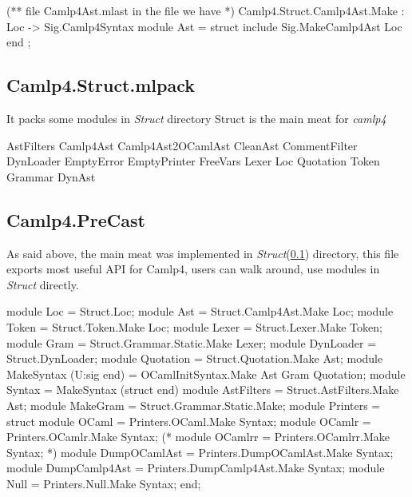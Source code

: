 \inputminted[fontsize=\scriptsize,]{ocaml}{code/camlp4/source/AstFilters.ml}



\begin{ocamlcode}
(** file Camlp4Ast.mlast   in the file we have *)
Camlp4.Struct.Camlp4Ast.Make : Loc -> Sig.Camlp4Syntax
  module Ast = struct
     include Sig.MakeCamlp4Ast Loc 
  end ;
\end{ocamlcode}


\subsection{Camlp4.Struct.mlpack}
\label{Camlp4.Struct}
It packs some modules in \textit{Struct} directory
Struct is the main meat for \textit{camlp4}

\begin{bashcode}
AstFilters
Camlp4Ast
Camlp4Ast2OCamlAst
CleanAst
CommentFilter
DynLoader
EmptyError
EmptyPrinter
FreeVars
Lexer
Loc
Quotation
Token
Grammar
DynAst
\end{bashcode}


\subsection{Camlp4.PreCast}

As said above, the main meat was implemented in
\textit{Struct}(\ref{Camlp4.Struct}) directory, this file exports most
useful API for Camlp4, users can walk around, use modules in
\textit{Struct} directly.

\begin{ocamlcode}
  module Loc = Struct.Loc;
  module Ast = Struct.Camlp4Ast.Make Loc;
  module Token = Struct.Token.Make Loc;
  module Lexer = Struct.Lexer.Make Token;
  module Gram = Struct.Grammar.Static.Make Lexer;
  module DynLoader = Struct.DynLoader;
  module Quotation = Struct.Quotation.Make Ast;
  module MakeSyntax (U:sig end) =
    OCamlInitSyntax.Make Ast Gram Quotation;
  module Syntax = MakeSyntax (struct end)
  module AstFilters = Struct.AstFilters.Make Ast;
  module MakeGram = Struct.Grammar.Static.Make;
  module Printers = struct
    module OCaml = Printers.OCaml.Make Syntax;
    module OCamlr = Printers.OCamlr.Make Syntax;
    (* module OCamlrr = Printers.OCamlrr.Make Syntax; *)
    module DumpOCamlAst = Printers.DumpOCamlAst.Make Syntax;
    module DumpCamlp4Ast = Printers.DumpCamlp4Ast.Make Syntax;
    module Null = Printers.Null.Make Syntax;
  end;
\end{ocamlcode}

